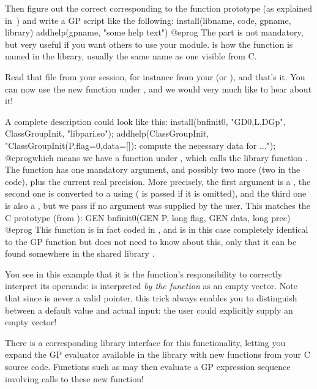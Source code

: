 Then figure out the correct  corresponding to the function
prototype (as explained in~) and write a GP script
like the following:
\bprog
install(libname, code, gpname, library)
addhelp(gpname, "some help text")
@eprog
\noindent The  part is not mandatory, but very useful if you
want others to use your module.  is how the function is named in
the library, usually the same name as one visible from C.

Read that file from your  session, for instance from your
 (or ), and that's it. You
can now use the new function  under , and we would very
much like to hear about it!
\smallskip

A complete description could look like this:
\bprog
{
  install(bnfinit0, "GD0,L,DGp", ClassGroupInit, "libpari.so");
  addhelp(ClassGroupInit, "ClassGroupInit(P,{flag=0},{data=[]}):
    compute the necessary data for ...");
}
@eprog\noindent which means we have a function  under
, which calls the library function  . The function has
one mandatory argument, and possibly two more (two  in the code),
plus the current real precision. More precisely, the first argument is a
, the second one is converted to a  using 
( is passed if it is omitted), and the third one is also a ,
but we pass  if no argument was supplied by the user. This matches
the C prototype (from ):
%
\bprog
  GEN bnfinit0(GEN P, long flag, GEN data, long prec)
@eprog\noindent
This function is in fact coded in , and is in this case
completely identical to the GP function  but  does not
need to know about this, only that it can be found somewhere in the shared
library .

 You see in this example that it is the
function's responsibility to correctly interpret its operands:  is interpreted \emph{by the function} as an empty vector. Note that
since  is never a valid  pointer, this trick always
enables you to distinguish between a default value and actual input: the
user could explicitly supply an empty vector!


There is a corresponding library interface for this 
functionality, letting you expand the GP evaluator available in the
library with new functions from your C source code. Functions such as
 may then evaluate a GP expression sequence involving calls
to these new function!


